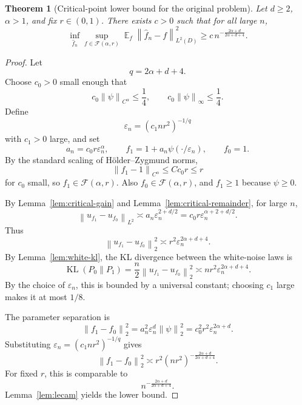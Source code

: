 \documentclass[12pt]{article}
\newtheorem{theorem}{Theorem}[section]
\theoremstyle{remark}
\DeclareMathOperator{\E}{\mathbb E}
\DeclareMathOperator{\KL}{KL}
\newcommand{\norm}[1]{\left\lVert #1\right\rVert}
\newcommand{\asym}{\asymp}
\begin{document}
\begin{theorem}[Critical-point lower bound for the original problem]
\label{thm:critical-lower}
Let \(d\ge2\), \(\alpha>1\), and fix \(r\in(0,1)\). There exists \(c>0\) such that for all large \(n\),
\[
\inf_{\widehat f_n}\sup_{f\in\mathcal F(\alpha,r)}
\E_f\norm{\widehat f_n-f}_{L^2(D)}^2
\ge
c\,n^{-\frac{2\alpha+d}{2\alpha+d+4}}.
\]
\end{theorem}
\begin{proof}
Let
\[
q=2\alpha+d+4.
\]
Choose \(c_0>0\) small enough that
\[
c_0\norm{\psi}_{C^\alpha}\le \frac14,
\qquad
c_0\norm{\psi}_\infty\le \frac14.
\]
Define
\[
\varepsilon_n=(c_1nr^2)^{-1/q}
\]
with \(c_1>0\) large, and set
\[
a_n=c_0r\varepsilon_n^\alpha,
\qquad
f_1=1+a_n\psi(\cdot/\varepsilon_n),
\qquad
f_0=1.
\]
By the standard scaling of H\"older--Zygmund norms,
\[
\norm{f_1-1}_{C^\alpha}
\le
C c_0r
\le r
\]
for \(c_0\) small, so \(f_1\in\mathcal F(\alpha,r)\). Also \(f_0\in\mathcal F(\alpha,r)\), and \(f_1\ge1\) because \(\psi\ge0\).

By Lemma~\ref{lem:critical-gain} and Lemma~\ref{lem:critical-remainder}, for large \(n\),
\[
\norm{u_{f_1}-u_{f_0}}_{L^2}
\asym
a_n\varepsilon_n^{2+d/2}
=
c_0r\varepsilon_n^{\alpha+2+d/2}.
\]
Thus
\[
\norm{u_{f_1}-u_{f_0}}_2^2
\asym
r^2\varepsilon_n^{2\alpha+d+4}.
\]
By Lemma~\ref{lem:white-kl}, the KL divergence between the white-noise laws is
\[
\KL(P_0\|P_1)
=
\frac n2\norm{u_{f_1}-u_{f_0}}_2^2
\asym
nr^2\varepsilon_n^{2\alpha+d+4}.
\]
By the choice of \(\varepsilon_n\), this is bounded by a universal constant; choosing \(c_1\) large makes it at most \(1/8\).

The parameter separation is
\[
\norm{f_1-f_0}_2^2
=
a_n^2\varepsilon_n^d\norm{\psi}_2^2
=
c_0^2r^2\varepsilon_n^{2\alpha+d}.
\]
Substituting \(\varepsilon_n=(c_1nr^2)^{-1/q}\) gives
\[
\norm{f_1-f_0}_2^2
\asym
r^2(nr^2)^{-\frac{2\alpha+d}{2\alpha+d+4}}.
\]
For fixed \(r\), this is comparable to
\[
n^{-\frac{2\alpha+d}{2\alpha+d+4}}.
\]
Lemma~\ref{lem:lecam} yields the lower bound.
\end{proof}
\end{document}
